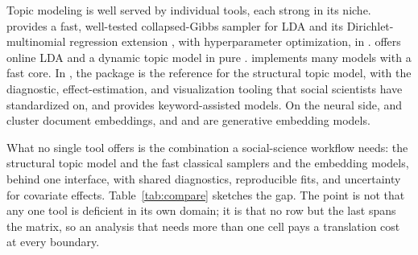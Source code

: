 \documentclass[article]{jss}
\begin{document}
Topic modeling is well served by individual tools, each strong in its niche.
 \citep{mccallum2002mallet} provides a fast, well-tested
collapsed-Gibbs sampler for LDA and its Dirichlet-multinomial regression
extension \citep{mimno2008dmr}, with hyperparameter optimization, in
.  \citep{rehurek2010gensim} offers online LDA and a
dynamic topic model in pure .  \citep{tomotopy}
implements many models with a fast  core. In , the
 package \citep{roberts2019stm} is the reference for the structural
topic model, with the diagnostic, effect-estimation, and visualization tooling
that social scientists have standardized on, and 
\citep{eshima2024keyatm} provides keyword-assisted models. On the neural side,
 \citep{grootendorst2022bertopic} and 
\citep{angelov2020top2vec} cluster document embeddings, and 
\citep{dieng2020etm} and  \citep{wu2024fastopic} are generative
embedding models.

What no single tool offers is the combination a social-science workflow needs:
the structural topic model and the fast classical samplers and the embedding
models, behind one interface, with shared diagnostics, reproducible fits, and
uncertainty for covariate effects. Table~\ref{tab:compare} sketches the
gap. The point is not that any one tool is deficient in its own domain; it is
that no row but the last spans the matrix, so an analysis that needs more than
one cell pays a translation cost at every boundary.
\end{document}
